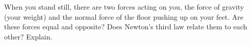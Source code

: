         When you stand still, there are two forces acting on you,
        the force of gravity (your weight) and the normal force of
        the floor pushing up on your feet. Are these forces equal
        and opposite? Does Newton's third law relate them to each
        other? Explain.
